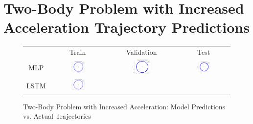 \documentclass[12pt,a4paper]{article}
\begin{document}
\section{Two-Body Problem with Increased Acceleration Trajectory Predictions}
\begin{figure}[H]
  \centering
  \caption{Two-Body Problem with Increased Acceleration: Model Predictions vs. Actual Trajectories}
  \label{fig:two_body_acc_predictions}
  \begin{tabular}{cccc}
      & Train & Validation & Test \\
      MLP &
      \includegraphics[width=0.27\textwidth]{../inference_results/train/MLP/two_body_force_increased_acceleration/500/full_trajectory_spaceship_0.png} &
      \includegraphics[width=0.27\textwidth]{../inference_results/val/MLP/two_body_force_increased_acceleration/500/full_trajectory_spaceship_0.png} &
      \includegraphics[width=0.27\textwidth]{../inference_results/test/MLP/two_body_force_increased_acceleration/500/full_trajectory_spaceship_0.png} \\
      LSTM &
      \includegraphics[width=0.27\textwidth]{../inference_results/train/LSTM/two_body_force_increased_acceleration/500/full_trajectory_spaceship_0.png} &

\end{tabular}
\end{figure}
\end{document}
